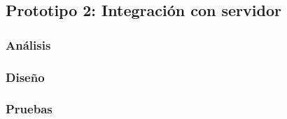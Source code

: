 \subsection{Prototipo 2: Integración con servidor}

\subsubsection{Análisis}

\subsubsection{Diseño}

\subsubsection{Pruebas}

